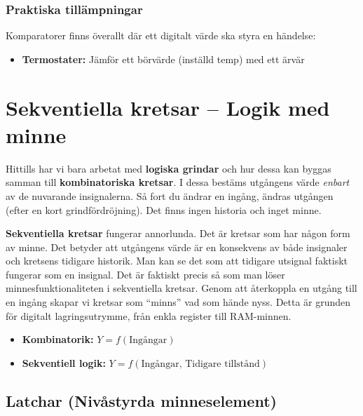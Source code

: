 \documentclass[
  swedish,
  letterpaper,
  oneside,
  openany]{book}
\providecommand{\tightlist}{%
  \setlength{\itemsep}{0pt}\setlength{\parskip}{0pt}}
\begin{document}
\subsection{Praktiska tillämpningar}\label{praktiska-tilluxe4mpningar}

Komparatorer finns överallt där ett digitalt värde ska styra en
händelse:

\begin{itemize}
\tightlist
\item
  \textbf{Termostater:} Jämför ett börvärde (inställd temp) med ett
  ärvär
\end{itemize}


\chapter{Sekventiella kretsar -- Logik med
minne}\label{sec-sekventiella-kretsar}

Hittills har vi bara arbetat med \textbf{logiska grindar} och hur dessa
kan byggas samman till \textbf{kombinatoriska kretsar}. I dessa bestäms
utgångens värde \emph{enbart} av de nuvarande insignalerna. Så fort du
ändrar en ingång, ändras utgången (efter en kort grindfördröjning). Det
finns ingen historia och inget minne.

\textbf{Sekventiella kretsar} fungerar annorlunda. Det är kretsar som
har någon form av minne. Det betyder att utgångens värde är en
konsekvens av både insignaler och kretsens tidigare historik. Man kan se
det som att tidigare utsignal faktiskt fungerar som en insignal. Det är
faktiskt precis så som man löser minnesfunktionaliteten i sekventiella
kretsar. Genom att återkoppla en utgång till en ingång skapar vi kretsar
som ``minns'' vad som hände nyss. Detta är grunden för digitalt
lagringsutrymme, från enkla register till RAM-minnen.

\begin{itemize}
\tightlist
\item
  \textbf{Kombinatorik:} \(Y = f(\text{Ingångar})\)
\item
  \textbf{Sekventiell logik:}
  \(Y = f(\text{Ingångar, Tidigare tillstånd})\)
\end{itemize}

\section{Latchar (Nivåstyrda minneselement)}\label{sec-latchar}
\end{document}
